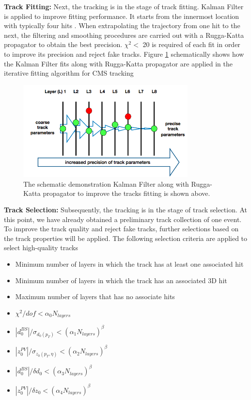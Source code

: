 \textbf{Track Fitting:} Next, the tracking is in the stage of track fitting. Kalman Filter \cite{Kalman} is applied to improve fitting performance. It starts from the innermost location with typically four hits \cite{CMSTrack1,CMSTrack2,CMSTrack3}. When extrapolating the trajectory from one hit to the next, the filtering and smoothing procedures are carried out with a Rugga-Katta propagator to obtain the best precision. $\chi^2 < $ 20 is required of each fit in order to improve its precision and reject fake tracks. Figure \ref{KalmanFitting} schematically shows how the Kalman Filter fits along with Rugga-Katta propagator are applied in the iterative fitting algorithm for CMS tracking


\begin{figure}[hbtp]
\begin{center}
\includegraphics[width=0.80\textwidth]{Figures/Chapter4/KalmanFitting.png}
\caption{The schematic demonstration Kalman Filter along with Rugga-Katta propagator to improve the tracks fitting is shown above.}
\label{KalmanFitting}
\end{center}
\end{figure} 


\textbf{Track Selection:} Subsequently, the tracking is in the stage of track selection. At this point, we have already obtained a preliminary track collection of one event. To improve the track quality and reject fake tracks, further selections based on the track properties will be applied. The following selection criteria are applied to select high-quality tracks \cite{CMSTrackComp}

\begin{itemize}
\item Minimum number of layers in which the track has at least one associated hit
\item Minimum number of layers in which the track has an associated 3D hit
\item Maximum number of layers that has no associate hits
\item $\chi^2/dof < \alpha_0 N_{layers}$ 
\item $|d_0^{BS}|/ \sigma_{d_0(p_T)} < (\alpha_1 N_{layers})^\beta$ 
\item $|z_0^{PV}|/ \sigma_{z_0(p_T,\eta)}  < (\alpha_2 N_{layers})^\beta$ 
\item $|d_0^{BS}|/\delta d_0 < (\alpha_3 N_{layers})^\beta$ 
\item $|z_0^{PV}|/\delta z_0 < (\alpha_4 N_{layers})^\beta$ 
\end{itemize}

